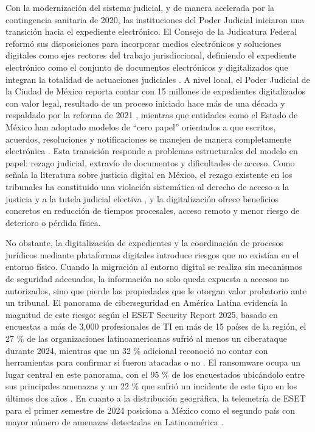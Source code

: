 Con la modernización del sistema judicial, y de manera acelerada por la contingencia sanitaria de 2020, las instituciones del Poder Judicial iniciaron una transición hacia el expediente electrónico. El Consejo de la Judicatura Federal reformó sus disposiciones para incorporar medios electrónicos y soluciones digitales como ejes rectores del trabajo jurisdiccional, definiendo el expediente electrónico como el conjunto de documentos electrónicos y digitalizados que integran la totalidad de actuaciones judiciales \cite{cjf_expediente2020}. A nivel local, el Poder Judicial de la Ciudad de México reporta contar con 15 millones de expedientes digitalizados con valor legal, resultado de un proceso iniciado hace más de una década y respaldado por la reforma de 2021 \cite{pjcdmx2023}, mientras que entidades como el Estado de México han adoptado modelos de ``cero papel'' orientados a que escritos, acuerdos, resoluciones y notificaciones se manejen de manera completamente electrónica \cite{heraldo2026}. Esta transición responde a problemas estructurales del modelo en papel: rezago judicial, extravío de documentos y dificultades de acceso. Como señala la literatura sobre justicia digital en México, el rezago existente en los tribunales ha constituido una violación sistemática al derecho de acceso a la justicia y a la tutela judicial efectiva \cite{bello2022}, y la digitalización ofrece beneficios concretos en reducción de tiempos procesales, acceso remoto y menor riesgo de deterioro o pérdida física.

No obstante, la digitalización de expedientes y la coordinación de procesos jurídicos mediante plataformas digitales introduce riesgos que no existían en el entorno físico. Cuando la migración al entorno digital se realiza sin mecanismos de seguridad adecuados, la información no solo queda expuesta a accesos no autorizados, sino que pierde las propiedades que le otorgan valor probatorio ante un tribunal. El panorama de ciberseguridad en América Latina evidencia la magnitud de este riesgo: según el ESET Security Report 2025, basado en encuestas a más de 3,000 profesionales de TI en más de 15 países de la región, el 27 \% de las organizaciones latinoamericanas sufrió al menos un ciberataque durante 2024, mientras que un 32 \% adicional reconoció no contar con herramientas para confirmar si fueron atacadas o no \cite{eset2025}. El ransomware ocupa un lugar central en este panorama, con el 95 \% de los encuestados ubicándolo entre sus principales amenazas y un 22 \% que sufrió un incidente de este tipo en los últimos dos años \cite{eset2025}. En cuanto a la distribución geográfica, la telemetría de ESET para el primer semestre de 2024 posiciona a México como el segundo país con mayor número de amenazas detectadas en Latinoamérica \cite{eset2024}.


